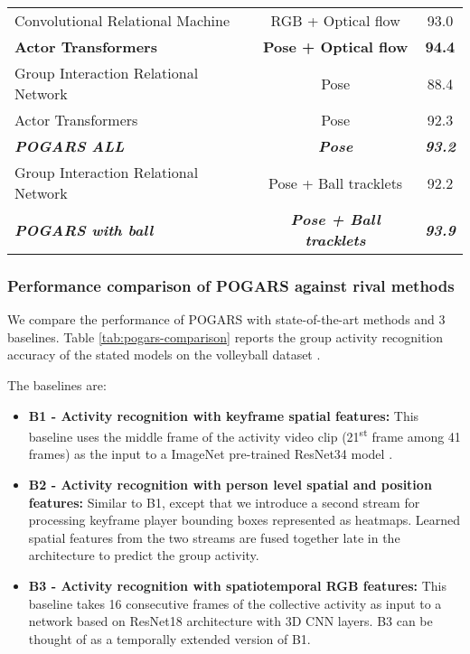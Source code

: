 \documentclass[a4paper,fleqn]{cas-dc}
\begin{document}
\begin{table}[pos=t]
{\begin{tabular}{lcc}
      Convolutional Relational Machine \cite{Azar2019_convoRelational}              & RGB + Optical flow                 & 93.0              \\
      \textbf{Actor Transformers \cite{Gavrilyuk2020_ActorTransformer}}             & \textbf{Pose + Optical flow}       & \textbf{94.4}     \\ \hdashline\noalign{\smallskip}
      Group Interaction Relational Network \cite{Perez2020_SkeletonBased_GIRN}      & Pose                               & 88.4              \\
      Actor Transformers \cite{Gavrilyuk2020_ActorTransformer}                      & Pose                               & 92.3              \\
      \textit{\textbf{POGARS ALL}}                                                  & \textit{\textbf{Pose}}             & \textit{\textbf{93.2}} \\ \hdashline\noalign{\smallskip}
      Group Interaction Relational Network \cite{Perez2020_SkeletonBased_GIRN}      & Pose + Ball tracklets              & 92.2              \\
  \textit{\textbf{POGARS with ball}}                                                & \textit{\textbf{Pose + Ball tracklets}} & \textit{\textbf{93.9}} \\ \hline
    \end{tabular}}
\end{table}


\subsubsection{Performance comparison of POGARS against rival methods}
\label{sssec:performance-comparison}

We compare the performance of POGARS with state-of-the-art methods and 3 baselines. Table \ref{tab:pogars-comparison} reports the group activity recognition accuracy of the stated models on the volleyball dataset \cite{Ibrahim2015_volleyballPaper}.

The baselines are:

\begin{itemize}
  \item \textbf{B1 - Activity recognition with keyframe spatial features:} This baseline uses the middle frame of the activity video clip (21\textsuperscript{st} frame among 41 frames) as the input to a ImageNet pre-trained ResNet34 model \cite{He2016_Resent}.
  \item \textbf{B2 - Activity recognition with person level spatial and position features:} Similar to B1, except that we introduce a second stream for processing keyframe player bounding boxes represented as heatmaps.
        Learned spatial features from the two streams are fused together late in the architecture to predict the group activity.
  \item \textbf{B3 - Activity recognition with spatiotemporal RGB features:} This baseline takes 16 consecutive frames of the collective activity as input to a network based on ResNet18 architecture with 3D CNN layers.
        B3 can be thought of as a temporally extended version of B1.
\end{itemize}
\end{document}

